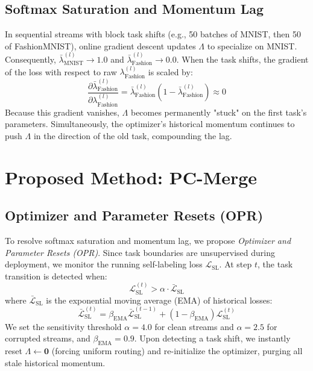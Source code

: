 \documentclass{article}
\theoremstyle{plain}
\theoremstyle{definition}
\theoremstyle{remark}
\begin{document}
\subsection{Softmax Saturation and Momentum Lag}
In sequential streams with block task shifts (e.g., 50 batches of MNIST, then 50 of FashionMNIST), online gradient descent updates $\Lambda$ to specialize on MNIST. Consequently, $\bar{\lambda}^{(l)}_{\text{MNIST}} \to 1.0$ and $\bar{\lambda}^{(l)}_{\text{Fashion}} \to 0.0$.
When the task shifts, the gradient of the loss with respect to raw $\lambda^{(l)}_{\text{Fashion}}$ is scaled by:
\begin{equation}
\frac{\partial \bar{\lambda}^{(l)}_{\text{Fashion}}}{\partial \lambda^{(l)}_{\text{Fashion}}} = \bar{\lambda}^{(l)}_{\text{Fashion}} (1 - \bar{\lambda}^{(l)}_{\text{Fashion}}) \approx 0
\end{equation}
Because this gradient vanishes, $\Lambda$ becomes permanently "stuck" on the first task's parameters. Simultaneously, the optimizer's historical momentum continues to push $\Lambda$ in the direction of the old task, compounding the lag.

\section{Proposed Method: PC-Merge}
\label{sec:method}

\subsection{Optimizer and Parameter Resets (OPR)}
To resolve softmax saturation and momentum lag, we propose \emph{Optimizer and Parameter Resets (OPR)}. Since task boundaries are unsupervised during deployment, we monitor the running self-labeling loss $\mathcal{L}_{\text{SL}}$. At step $t$, the task transition is detected when:
\begin{equation}
\mathcal{L}_{\text{SL}}^{(t)} > \alpha \cdot \bar{\mathcal{L}}_{\text{SL}}
\end{equation}
where $\bar{\mathcal{L}}_{\text{SL}}$ is the exponential moving average (EMA) of historical losses:
\begin{equation}
\bar{\mathcal{L}}_{\text{SL}}^{(t)} = \beta_{\text{EMA}} \bar{\mathcal{L}}_{\text{SL}}^{(t-1)} + (1 - \beta_{\text{EMA}}) \mathcal{L}_{\text{SL}}^{(t)}
\end{equation}
We set the sensitivity threshold $\alpha = 4.0$ for clean streams and $\alpha = 2.5$ for corrupted streams, and $\beta_{\text{EMA}} = 0.9$. Upon detecting a task shift, we instantly reset $\Lambda \leftarrow \mathbf{0}$ (forcing uniform routing) and re-initialize the optimizer, purging all stale historical momentum.
\end{document}
